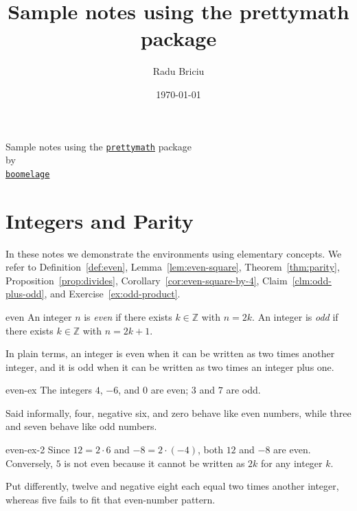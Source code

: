 \documentclass[11pt,a4paper]{article}
\title{Sample notes using the prettymath package}
\author{Radu Briciu}
\date{\today}
\begin{document}
	
\begin{titlepage}
	\vfill
	\begin{center}
		\huge{Sample notes using the \href{https://github.com/boomelage/prettymath/blob/e4b6f0a6f1508e82686c20fdde10e6ff6c494d7f/prettymath.sty}{\texttt{prettymath}} package} \\
		\vspace{3em}
		\tiny by \\
		\small \href{https://github.com/boomelage}{\texttt{boomelage}}
	\end{center}
	\vfill
	\tableofcontents
	\vfill
\end{titlepage}

\clearpage
{}

\section{Integers and Parity}

In these notes we demonstrate the environments using elementary concepts. We refer to Definition~\ref{def:even}, Lemma~\ref{lem:even-square}, Theorem~\ref{thm:parity}, Proposition~\ref{prop:divides}, Corollary~\ref{cor:even-square-by-4}, Claim~\ref{clm:odd-plus-odd}, and Exercise~\ref{ex:odd-product}.

\begin{definition}{}{even}
An integer $n$ is \emph{even} if there exists $k\in \mathbb{Z}$ with $n=2k$. An integer is \emph{odd} if there exists $k\in\mathbb{Z}$ with $n=2k+1$.
\end{definition}
In plain terms, an integer is even when it can be written as two times another integer, and it is odd when it can be written as two times an integer plus one.

\begin{example}{}{even-ex}
The integers $4$, $-6$, and $0$ are even; $3$ and $7$ are odd.
\end{example}
Said informally, four, negative six, and zero behave like even numbers, while three and seven behave like odd numbers.

\begin{example}{}{even-ex-2}
Since $12=2\cdot6$ and $-8=2\cdot(-4)$, both $12$ and $-8$ are even. Conversely, $5$ is not even because it cannot be written as $2k$ for any integer $k$.
\end{example}
Put differently, twelve and negative eight each equal two times another integer, whereas five fails to fit that even-number pattern.
\end{document}
